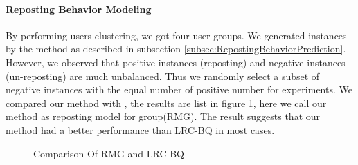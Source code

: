 \paragraph{Reposting Behavior Modeling}
By performing users clustering, we got four user groups. We generated instances by the method as described in subsection \ref{subsec:RepostingBehaviorPrediction}. However, we observed that positive instances (reposting) and negative instances (un-reposting) are much unbalanced. Thus we randomly select a subset of negative instances with the equal number of positive number for experiments. We compared our method with \cite{IEEEexample:conf/ijcai/ZhangLTCL13}, the results are list in figure \ref{fig:comparisons}, here we call our method as reposting model for group(RMG). The result suggests that our method had a better performance than LRC-BQ in most cases.\par

 \begin{figure}
  \centering
  \hspace{1in}
  \hspace{1in}
  \caption{Comparison Of RMG and LRC-BQ}
  \label{fig:comparisons} %
\end{figure}


